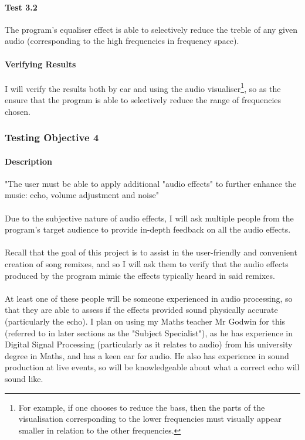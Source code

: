 \paragraph{Test 3.2}
The program's equaliser effect is able to selectively reduce the treble of any given audio (corresponding to the high frequencies in frequency space).

\paragraph{Verifying Results}
I will verify the results both by ear and using the audio visualiser\footnote{
	For example, if one chooses to reduce the bass, then the parts
	of the visualisation corresponding to the lower frequencies must
	visually appear smaller in relation to the other frequencies.
}, so as the ensure that the program is able to selectively reduce the range of frequencies chosen.

\pagebreak
\subsubsection{Testing Objective 4}
\paragraph{Description} "The user must be able to apply additional "audio effects" to further enhance the music: echo, volume adjustment and noise"

\paragraph{}
Due to the subjective nature of audio effects, I will ask multiple people from the program's target audience to provide in-depth feedback on all the audio effects.

\paragraph{}
Recall that the goal of this project is to assist in the user-friendly and convenient creation of song remixes, and so I will ask them to verify that the audio effects produced by the program mimic the effects typically heard in said remixes.

\paragraph{}
At least one of these people will be someone experienced in audio processing, so that they are able to assess if the effects provided sound physically accurate
(particularly the echo). I plan on using my Maths teacher Mr Godwin for this (referred to in later sections as the "Subject Specialist"), as he has experience in Digital Signal Processing (particularly as it relates to audio) from his university degree in Maths, and has a keen ear for audio. He also has experience in sound production at live events, so will be knowledgeable about what a correct echo will sound like.

